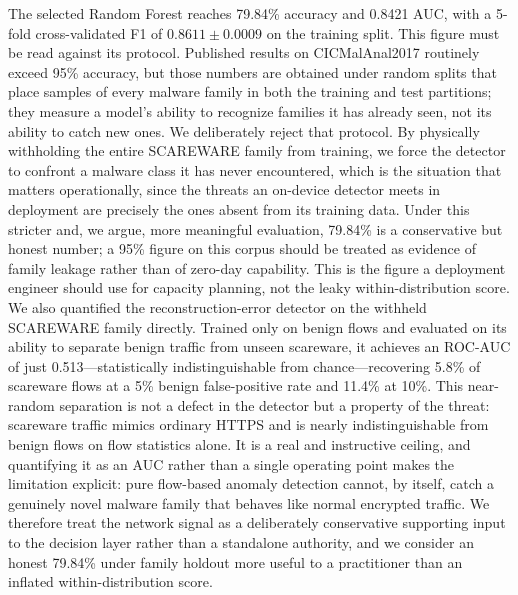 \documentclass[manuscript,screen,review]{acmart}
\begin{document}
The selected Random Forest reaches 79.84\% accuracy and 0.8421 AUC, with a 5-fold cross-validated F1 of $0.8611 \pm 0.0009$ on the training split. This figure must be read against its protocol. Published results on CICMalAnal2017 routinely exceed 95\% accuracy, but those numbers are obtained under random splits that place samples of every malware family in both the training and test partitions; they measure a model's ability to recognize families it has already seen, not its ability to catch new ones. We deliberately reject that protocol. By physically withholding the entire SCAREWARE family from training, we force the detector to confront a malware class it has never encountered, which is the situation that matters operationally, since the threats an on-device detector meets in deployment are precisely the ones absent from its training data. Under this stricter and, we argue, more meaningful evaluation, 79.84\% is a conservative but honest number; a 95\% figure on this corpus should be treated as evidence of family leakage rather than of zero-day capability. This is the figure a deployment engineer should use for capacity planning, not the leaky within-distribution score. \label{sec:scareware}We also quantified the reconstruction-error detector on the withheld SCAREWARE family directly. Trained only on benign flows and evaluated on its ability to separate benign traffic from unseen scareware, it achieves an ROC-AUC of just 0.513---statistically indistinguishable from chance---recovering 5.8\% of scareware flows at a 5\% benign false-positive rate and 11.4\% at 10\%. This near-random separation is not a defect in the detector but a property of the threat: scareware traffic mimics ordinary HTTPS and is nearly indistinguishable from benign flows on flow statistics alone. It is a real and instructive ceiling, and quantifying it as an AUC rather than a single operating point makes the limitation explicit: pure flow-based anomaly detection cannot, by itself, catch a genuinely novel malware family that behaves like normal encrypted traffic. We therefore treat the network signal as a deliberately conservative supporting input to the decision layer rather than a standalone authority, and we consider an honest 79.84\% under family holdout more useful to a practitioner than an inflated within-distribution score.
\end{document}
